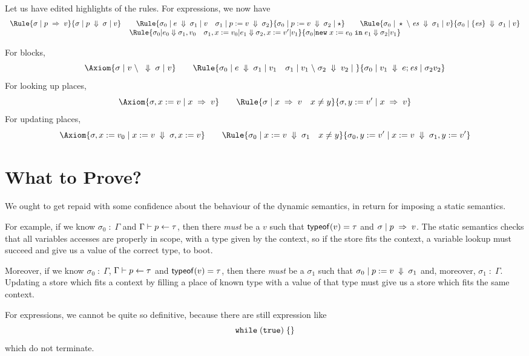 \documentclass{article}
\begin{document}
Let us have edited highlights of the rules. For expressions,
we now have
\[\begin{array}{c}
  \Rule{\JPll\sigma pv}
  {\JEv \sigma p\sigma v}
  \qquad
  \Rule{\JEv{\sigma_0}e{\sigma_1}v\quad
    \JPla{\sigma_1}pv{\sigma_2}}
  {\JEv{\sigma_0}{p\ass v}{\sigma_2}\star}
  \qquad
  \Rule{\JEvs{\sigma_0}\star\es{\sigma_1}v}
  {\JEv{\sigma_0}{\{\es\}}{\sigma_1}v}
  \\
  \Rule{\sigma_0|e_0 \Downarrow \sigma_1, v_0\quad
    \sigma_1,x:=v_0|e_1 \Downarrow \sigma_2,x:=v'|v_1}
  {\sigma_0|\newe x{e_0}{e_1} \Downarrow \sigma_2 | v_1}
  \end{array}\]

For blocks,
\[
  \Axiom{\JEvs\sigma v{}\sigma v} \qquad
  \Rule{\JEv{\sigma_0}e{\sigma_1}{v_1} \quad
    \JEvs{\sigma_1}{v_1}{\sigma_2}{v_2}}
  {\JEv{\sigma_0}{v_1}{e;\es}{\sigma_2}{v_2}}
\]
For looking up places,
\[
  \Axiom{\JPll{\sigma,x:=v}xv} \qquad
  \Rule{\JPll\sigma xv \quad x\neq y}
        {\JPll{\sigma,y:=v'}xv}
\]
For updating places,
\[
  \Axiom{\JPla{\sigma,x:=v_0}xv{\sigma,x:=v}} \qquad
  \Rule{\JPla{\sigma_0}xv{\sigma_1}\quad x\neq y}
       {\JPla{\sigma_0,y:=v'}xv{\sigma_1,y:=v'}}
\]


\section{What to Prove?}

We ought to get repaid with some confidence about the behaviour of the dynamic semantics, in return for imposing a static semantics.

For example, if we know $\sigma_0 \;:\; \Gamma$ and $\Gamma \vdash p \leftarrow \tau$,
then there \emph{must} be a $v$ such that $\mathsf{typeof}(v) = \tau$ and $\sigma \;|\; p \;\Rightarrow\;v$.
The static semantics checks that all variables accesses are properly
in scope, with a type given by the context, so if the store fits the
context, a variable lookup must succeed and give us a value of the correct type, to boot.

Moreover, if we know $\sigma_0 \;:\; \Gamma$, $\Gamma \vdash p \leftarrow \tau$ and
$\mathsf{typeof}(v) = \tau$, then there \emph{must} be a $\sigma_1$ such that
$\sigma_0 \;|\; p\;\mathtt{:=}\; v \;\Downarrow\;\sigma_1$ and, moreover, $\sigma_1\;:\;\Gamma$.
Updating a store which fits a context by filling a place of known type with
a value of that type must give us a store which fits the same context.

For expressions, we cannot be quite so definitive, because there are still
expression like
\[
  \mathtt{while}\; \mathtt{(}\mathtt{true}\mathtt{)} \;\{\}
\]
which do not terminate.
\end{document}
